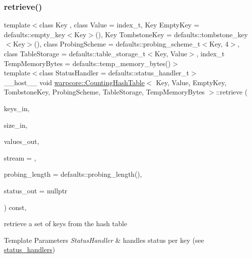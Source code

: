 \subsubsection{\texorpdfstring{retrieve()}{retrieve()}\hspace{0.1cm}{\footnotesize\ttfamily [2/2]}}
{\footnotesize\ttfamily template$<$class Key , class Value  = index\+\_\+t, Key Empty\+Key = defaults\+::empty\+\_\+key$<$\+Key$>$(), Key Tombstone\+Key = defaults\+::tombstone\+\_\+key$<$\+Key$>$(), class Probing\+Scheme  = defaults\+::probing\+\_\+scheme\+\_\+t$<$\+Key, 4$>$, class Table\+Storage  = defaults\+::table\+\_\+storage\+\_\+t$<$\+Key, Value$>$, index\+\_\+t Temp\+Memory\+Bytes = defaults\+::temp\+\_\+memory\+\_\+bytes()$>$ \\
template$<$class Status\+Handler  = defaults\+::status\+\_\+handler\+\_\+t$>$ \\
\+\_\+\+\_\+host\+\_\+\+\_\+ void \hyperlink{classwarpcore_1_1CountingHashTable}{warpcore\+::\+Counting\+Hash\+Table}$<$ Key, Value, Empty\+Key, Tombstone\+Key, Probing\+Scheme, Table\+Storage, Temp\+Memory\+Bytes $>$\+::retrieve (\begin{DoxyParamCaption}\item[{key\+\_\+type $\ast$}]{keys\+\_\+in,  }\item[{index\+\_\+type}]{size\+\_\+in,  }\item[{value\+\_\+type $\ast$}]{values\+\_\+out,  }\item[{cuda\+Stream\+\_\+t}]{stream = {},  }\item[{index\+\_\+type}]{probing\+\_\+length = {\ttfamily defaults\+:\+:probing\+\_\+length()},  }\item[{typename Status\+Handler\+::base\+\_\+type $\ast$}]{status\+\_\+out = {\ttfamily nullptr} }\end{DoxyParamCaption}) const\hspace{0.3cm}{\ttfamily [inline]}, {\ttfamily [noexcept]}}



retrieve a set of keys from the hash table 


\begin{DoxyTemplParams}{Template Parameters}
{\em Status\+Handler} & handles status per key (see {\ttfamily \hyperlink{namespacewarpcore_1_1status__handlers}{status\+\_\+handlers}}) \\
\hline
\end{DoxyTemplParams}

